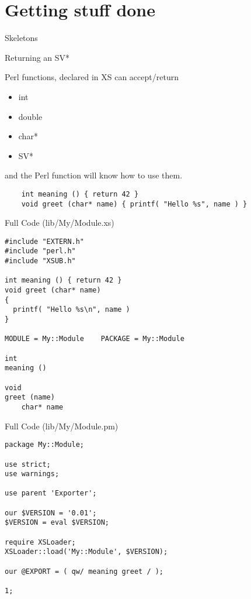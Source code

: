 \documentclass{beamer}
\begin{document}
\section{Getting stuff done}

\begin{frame}{Skeletons}

\end{frame}

\begin{frame}[fragile]{Returning an SV*}
  \lstset{language=C}

  Perl functions, declared in XS can accept/return
  \begin{itemize}
    \item int
    \item double
    \item char*
    \item SV*
  \end{itemize}
  and the Perl function will know how to use them.
  \begin{lstlisting}
    int meaning () { return 42 }
    void greet (char* name) { printf( "Hello %s", name ) } 
  \end{lstlisting}
\end{frame}

\begin{frame}[fragile]{Full Code (lib/My/Module.xs)}
  \lstset{language=C}

  \begin{lstlisting}
#include "EXTERN.h"
#include "perl.h"
#include "XSUB.h"

int meaning () { return 42 }
void greet (char* name) 
{
  printf( "Hello %s\n", name ) 
}

MODULE = My::Module    PACKAGE = My::Module

int
meaning ()

void
greet (name)
    char* name
  \end{lstlisting}
\end{frame}

\begin{frame}[fragile]{Full Code (lib/My/Module.pm)}
  \lstset{language=Perl}
  \begin{lstlisting}
package My::Module;

use strict;
use warnings;

use parent 'Exporter';

our $VERSION = '0.01';
$VERSION = eval $VERSION;

require XSLoader;
XSLoader::load('My::Module', $VERSION);

our @EXPORT = ( qw/ meaning greet / );

1;
  \end{lstlisting}
\end{frame}
\end{document}
